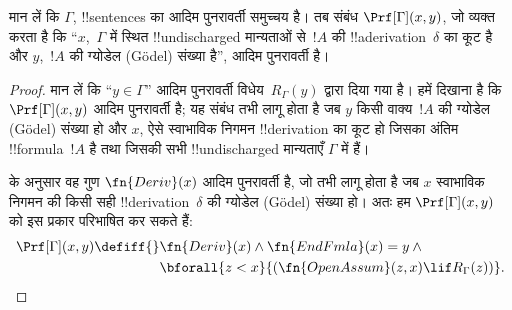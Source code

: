 \documentclass[../../../include/open-logic-section]{subfiles}
\begin{document}
\begin{prop}
  मान लें कि $\Gamma$, !!{sentence}s का आदिम पुनरावर्ती समुच्चय है। तब
  संबंध $\Prf[\Gamma](x, y)$, जो व्यक्त करता है कि ``$x$,~$\Gamma$ में
  स्थित !!{undischarged} मान्यताओं से~$!A$ की !!a{derivation}~$\delta$ का
  कूट है और $y$,~$!A$ की ग्योडेल (G\"odel) संख्या है'', आदिम पुनरावर्ती है।
\end{prop}

\begin{proof}
  मान लें कि ``$y \in \Gamma$'' आदिम पुनरावर्ती विधेय~$R_\Gamma(y)$ द्वारा
  दिया गया है। हमें दिखाना है कि $\Prf[\Gamma](x, y)$ आदिम पुनरावर्ती है;
  यह संबंध तभी लागू होता है जब $y$ किसी वाक्य~$!A$ की ग्योडेल (G\"odel)
  संख्या हो और $x$, ऐसे स्वाभाविक निगमन !!{derivation} का कूट हो जिसका
  अंतिम !!{formula}~$!A$ है तथा जिसकी सभी !!{undischarged} मान्यताएँ
  $\Gamma$ में हैं।

   के अनुसार वह गुण $\fn{Deriv}(x)$ आदिम पुनरावर्ती है,
  जो तभी लागू होता है जब $x$ स्वाभाविक निगमन की किसी सही
  !!{derivation}~$\delta$ की ग्योडेल (G\"odel) संख्या हो। अतः हम
  $\Prf[\Gamma](x, y)$ को इस प्रकार परिभाषित कर सकते हैं:
  \begin{align*}
    \Prf[\Gamma](x, y) \defiff {}
    & \fn{Deriv}(x) \land \fn{EndFmla}(x) = y \land {} \\
    & \bforall{z < x}{(\fn{OpenAssum}(z, x) \lif R_\Gamma(z))}.
  \end{align*}
\end{proof}
\end{document}
